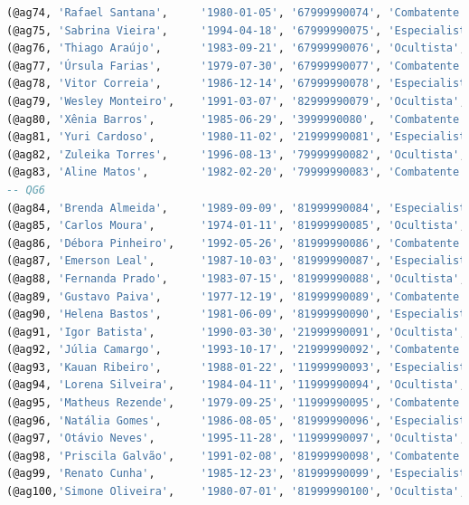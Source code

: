 \documentclass[12pt,a4paper]{report}
\begin{document}
\begin{lstlisting}[language=SQL, caption=population.sql]
(@ag74, 'Rafael Santana',     '1980-01-05', '67999990074', 'Combatente',   'Veterano', 52, FALSE, FALSE),
(@ag75, 'Sabrina Vieira',     '1994-04-18', '67999990075', 'Especialista', 'Elite',    48, FALSE, FALSE), -- VER 5
(@ag76, 'Thiago Araújo',      '1983-09-21', '67999990076', 'Ocultista',    'Veterano', 44, FALSE, FALSE),
(@ag77, 'Úrsula Farias',      '1979-07-30', '67999990077', 'Combatente',   'Elite',    89, FALSE, TRUE),
(@ag78, 'Vitor Correia',      '1986-12-14', '67999990078', 'Especialista', 'Veterano', 63, FALSE, FALSE),
(@ag79, 'Wesley Monteiro',    '1991-03-07', '82999990079', 'Ocultista',    'Veterano', 36, FALSE, FALSE),
(@ag80, 'Xênia Barros',       '1985-06-29', '3999990080',  'Combatente',   'Veterano', 58, FALSE, FALSE),
(@ag81, 'Yuri Cardoso',       '1980-11-02', '21999990081', 'Especialista', 'Elite',    87, FALSE, TRUE),
(@ag82, 'Zuleika Torres',     '1996-08-13', '79999990082', 'Ocultista',    'Recruta',  20, FALSE, FALSE),
(@ag83, 'Aline Matos',        '1982-02-20', '79999990083', 'Combatente',   'Veterano', 34, FALSE, FALSE),
-- QG6
(@ag84, 'Brenda Almeida',     '1989-09-09', '81999990084', 'Especialista', 'Veterano', 61, FALSE, FALSE),
(@ag85, 'Carlos Moura',       '1974-01-11', '81999990085', 'Ocultista',    'Elite',    93, FALSE, FALSE),
(@ag86, 'Débora Pinheiro',    '1992-05-26', '81999990086', 'Combatente',   'Recruta',  8,  FALSE, FALSE),
(@ag87, 'Emerson Leal',       '1987-10-03', '81999990087', 'Especialista', 'Veterano', 42, FALSE, FALSE),
(@ag88, 'Fernanda Prado',     '1983-07-15', '81999990088', 'Ocultista',    'Veterano', 53, FALSE, FALSE),
(@ag89, 'Gustavo Paiva',      '1977-12-19', '81999990089', 'Combatente',   'Elite',    97, FALSE, TRUE),
(@ag90, 'Helena Bastos',      '1981-06-09', '81999990090', 'Especialista', 'Veterano', 67, FALSE, FALSE),
(@ag91, 'Igor Batista',       '1990-03-30', '21999990091', 'Ocultista',    'Veterano', 41, FALSE, FALSE),
(@ag92, 'Júlia Camargo',      '1993-10-17', '21999990092', 'Combatente',   'Recruta',  19, FALSE, FALSE),
(@ag93, 'Kauan Ribeiro',      '1988-01-22', '11999990093', 'Especialista', 'Veterano', 39, FALSE, FALSE),
(@ag94, 'Lorena Silveira',    '1984-04-11', '11999990094', 'Ocultista',    'Veterano', 59, FALSE, FALSE), -- VER 6
(@ag95, 'Matheus Rezende',    '1979-09-25', '11999990095', 'Combatente',   'Elite',    90, FALSE, TRUE),
(@ag96, 'Natália Gomes',      '1986-08-05', '81999990096', 'Especialista', 'Veterano', 62, TRUE,  FALSE),
(@ag97, 'Otávio Neves',       '1995-11-28', '11999990097', 'Ocultista',    'Recruta',  16, FALSE, FALSE),
(@ag98, 'Priscila Galvão',    '1991-02-08', '81999990098', 'Combatente',   'Veterano', 37, FALSE, FALSE),
(@ag99, 'Renato Cunha',       '1985-12-23', '81999990099', 'Especialista', 'Veterano', 56, FALSE, FALSE),
(@ag100,'Simone Oliveira',    '1980-07-01', '81999990100', 'Ocultista',    'Elite',    96, FALSE, TRUE);


\end{lstlisting}
\end{document}
